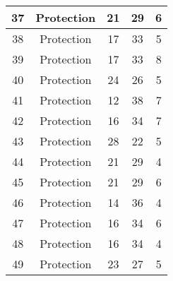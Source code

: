 \documentclass[results.tex]{subfiles}
\begin{document}
\begin{center}
\begin{tabular}{| c || c | c | c | c |}
            \hline
            37                      & Protection                   & 21                     & 29                      & 6                    \\
            \hline
            38                      & Protection                   & 17                     & 33                      & 5                    \\
            \hline
            39                      & Protection                   & 17                     & 33                      & 8                    \\
            \hline
            40                      & Protection                   & 24                     & 26                      & 5                    \\
            \hline
            41                      & Protection                   & 12                     & 38                      & 7                    \\
            \hline
            42                      & Protection                   & 16                     & 34                      & 7                    \\
            \hline
            43                      & Protection                   & 28                     & 22                      & 5                    \\
            \hline
            44                      & Protection                   & 21                     & 29                      & 4                    \\
            \hline
            45                      & Protection                   & 21                     & 29                      & 6                    \\
            \hline
            46                      & Protection                   & 14                     & 36                      & 4                    \\
            \hline
            47                      & Protection                   & 16                     & 34                      & 6                    \\
            \hline
            48                      & Protection                   & 16                     & 34                      & 4                    \\
            \hline
            49                      & Protection                   & 23                     & 27                      & 5                    \\
            \hline
        \end{tabular}
    \end{center}
\end{document}
